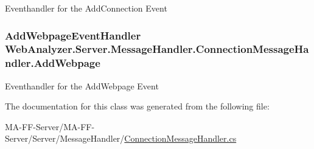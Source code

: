 Eventhandler for the Add\+Connection Event 

\hypertarget{class_web_analyzer_1_1_server_1_1_message_handler_1_1_connection_message_handler_a4a1e2b8d5b77a7559db92b1e1a07aed9}{}
\subsubsection[{Add\+Webpage}]{\setlength{\rightskip}{0pt plus 5cm}Add\+Webpage\+Event\+Handler Web\+Analyzer.\+Server.\+Message\+Handler.\+Connection\+Message\+Handler.\+Add\+Webpage}\label{class_web_analyzer_1_1_server_1_1_message_handler_1_1_connection_message_handler_a4a1e2b8d5b77a7559db92b1e1a07aed9}


Eventhandler for the Add\+Webpage Event 



The documentation for this class was generated from the following file\+:\begin{DoxyCompactItemize}
\item 
M\+A-\/\+F\+F-\/\+Server/\+M\+A-\/\+F\+F-\/\+Server/\+Server/\+Message\+Handler/\hyperlink{_connection_message_handler_8cs}{Connection\+Message\+Handler.\+cs}\end{DoxyCompactItemize}
